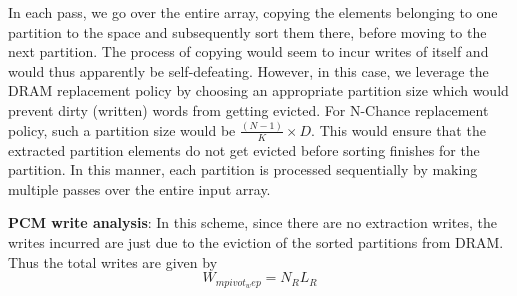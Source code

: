 In each pass, we go over the entire array, copying the elements belonging to one partition to the space and subsequently sort them there, before moving to the next partition. The process of copying would seem to incur writes of itself and would thus apparently be self-defeating. However, in this case, we leverage the DRAM replacement policy by choosing an appropriate partition size which would prevent dirty (written) words from getting evicted. For N-Chance replacement policy, such a partition size would be $\frac{(N-1)}{K}\times D$. This would ensure that the extracted partition elements do not get evicted before sorting finishes for the partition. In this manner, each partition is processed sequentially by making multiple passes over the entire input array.

\textbf{PCM write analysis}: In this scheme, since there are no extraction writes, the writes incurred are just due to the eviction of the sorted partitions from DRAM. Thus the total writes are given by 
\begin{equation}\label{eq:mpivot_wep}
  W_{mpivot_wep} = N_RL_R
\end{equation}